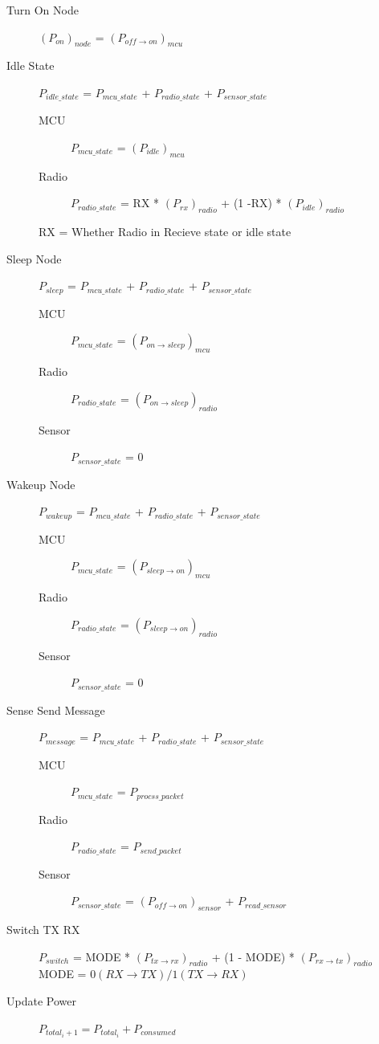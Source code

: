 \documentclass{article}
\begin{document}
\begin{description}
	
	\item[Turn On Node] $(P_{on})_{node}$ = $(P_{off \to on})_{mcu}$
	\item[Idle State] $P_{idle\_state}$ = $P_{mcu\_state}$ + $P_{radio\_state}$ + $P_{sensor\_state}$ \\
		\begin{description}
			\item[MCU] $P_{mcu\_state}$ = $(P_{idle})_{mcu} $
			\item[Radio] $P_{radio\_state}$ = RX * $(P_{rx})_{radio}$ + (1 -RX) * $(P_{idle})_{radio}$
		\end{description}
	RX = Whether Radio in Recieve state or idle state
	\item[Sleep Node] $P_{sleep}$ = $P_{mcu\_state}$ + $P_{radio\_state}$ + $P_{sensor\_state}$ \\
		\begin{description}
			\item[MCU] $P_{mcu\_state}$ = $(P_{on \to sleep})_{mcu}$
			\item[Radio] $P_{radio\_state}$ = $(P_{on \to sleep})_{radio}$
			\item[Sensor] $P_{sensor\_state}$ = 0
		\end{description}
	\item[Wakeup Node] $P_{wakeup}$ = $P_{mcu\_state}$ + $P_{radio\_state}$ + $P_{sensor\_state}$ \\
		\begin{description}
			\item[MCU] $P_{mcu\_state}$ = $(P_{sleep \to on})_{mcu}$
			\item[Radio] $P_{radio\_state}$ = $(P_{sleep \to on})_{radio}$
			\item[Sensor] $P_{sensor\_state}$ = 0
		\end{description}
	\item[Sense Send Message] $P_{message}$ = $P_{mcu\_state}$ + $P_{radio\_state}$ + $P_{sensor\_state}$ \\
		\begin{description}
			\item[MCU] $P_{mcu\_state}$ = $P_{procss\_packet}$
			\item[Radio] $P_{radio\_state}$ = $P_{send\_packet}$
			\item[Sensor] $P_{sensor\_state}$ = $(P_{off \to on})_{sensor}$ + $P_{read\_sensor}$
		\end{description}
	\item[Switch TX RX] $P_{switch}$ = MODE * $(P_{tx \to rx})_{radio}$ + (1 - MODE) * $(P_{rx \to tx})_{radio}$
	MODE = $0(RX \to TX)/1(TX \to RX)$
	\item[Update Power] $P_{total_i+1} = P_{total_i} + P_{consumed}$
\end{description}
\end{document}
